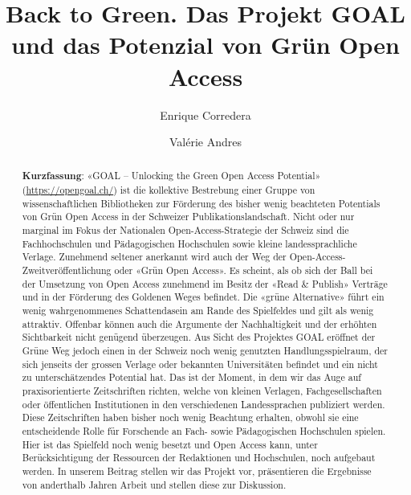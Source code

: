 \documentclass[a4paper,
fontsize=11pt,
oneside,
numbers=noperiodatend,
parskip=half-,
bibliography=totoc,
final
]{scrartcl}
\title{\LARGE{Back to Green. Das Projekt GOAL und das Potenzial von Grün Open Access}}%
\author{Enrique Corredera \and Valérie Andres} %
\date{}
\begin{document}
\maketitle
\thispagestyle{fancyplain} 

\begin{abstract}
\noindent
\textbf{Kurzfassung}: «GOAL -- Unlocking the Green Open Access
Potential» (\url{https://opengoal.ch/}) ist die kollektive Bestrebung
einer Gruppe von wissenschaftlichen Bibliotheken zur Förderung des
bisher wenig beachteten Potentials von Grün Open Access in der Schweizer
Publikationslandschaft. Nicht oder nur marginal im Fokus der Nationalen
Open-Access-Strategie der Schweiz sind die Fachhochschulen und
Pädagogischen Hochschulen sowie kleine landessprachliche Verlage.
Zunehmend seltener anerkannt wird auch der Weg der
Open-Access-Zweitveröffentlichung oder «Grün Open Access». Es scheint,
als ob sich der Ball bei der Umsetzung von Open Access zunehmend im
Besitz der «Read \& Publish» Verträge und in der Förderung des Goldenen
Weges befindet. Die «grüne Alternative» führt ein wenig wahrgenommenes
Schattendasein am Rande des Spielfeldes und gilt als wenig attraktiv.
Offenbar können auch die Argumente der Nachhaltigkeit und der erhöhten
Sichtbarkeit nicht genügend überzeugen. Aus Sicht des Projektes GOAL
eröffnet der Grüne Weg jedoch einen in der Schweiz noch wenig genutzten
Handlungsspielraum, der sich jenseits der grossen Verlage oder bekannten
Universitäten befindet und ein nicht zu unterschätzendes Potential hat.
Das ist der Moment, in dem wir das Auge auf praxisorientierte
Zeitschriften richten, welche von kleinen Verlagen, Fachgesellschaften
oder öffentlichen Institutionen in den verschiedenen Landessprachen
publiziert werden. Diese Zeitschriften haben bisher noch wenig Beachtung
erhalten, obwohl sie eine entscheidende Rolle für Forschende an Fach-
sowie Pädagogischen Hochschulen spielen. Hier ist das Spielfeld noch
wenig besetzt und Open Access kann, unter Berücksichtigung der
Ressourcen der Redaktionen und Hochschulen, noch aufgebaut werden. In
unserem Beitrag stellen wir das Projekt vor, präsentieren die Ergebnisse
von anderthalb Jahren Arbeit und stellen diese zur Diskussion.


\end{abstract}
\end{document}
